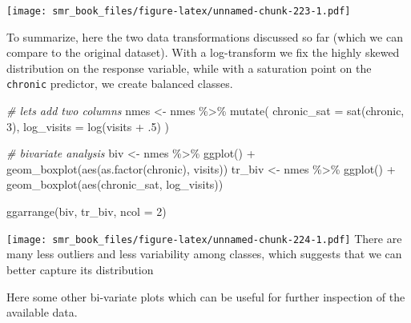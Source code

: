 \documentclass[
  oneside]{book}
\newenvironment{Shaded}{\begin{snugshade}}{\end{snugshade}}
\newcommand{\AttributeTok}[1]{\textcolor[rgb]{0.77,0.63,0.00}{#1}}
\newcommand{\CommentTok}[1]{\textcolor[rgb]{0.56,0.35,0.01}{\textit{#1}}}
\newcommand{\DecValTok}[1]{\textcolor[rgb]{0.00,0.00,0.81}{#1}}
\newcommand{\FunctionTok}[1]{\textcolor[rgb]{0.00,0.00,0.00}{#1}}
\newcommand{\NormalTok}[1]{#1}
\newcommand{\OtherTok}[1]{\textcolor[rgb]{0.56,0.35,0.01}{#1}}
\newcommand{\SpecialCharTok}[1]{\textcolor[rgb]{0.00,0.00,0.00}{#1}}
\begin{document}
\texttt{[image: smr\_book\_files/figure-latex/unnamed-chunk-223-1.pdf]}

To summarize, here the two data transformations discussed so far (which we can compare to the
original dataset). With a log-transform we fix the highly skewed distribution on the response
variable, while with a saturation point on the \texttt{chronic} predictor, we create balanced classes.

\begin{Shaded}
\begin{Highlighting}[]
\CommentTok{\# let\textquotesingle{}s add two columns}
\NormalTok{nmes }\OtherTok{\textless{}{-}}\NormalTok{ nmes }\SpecialCharTok{\%\textgreater{}\%}
  \FunctionTok{mutate}\NormalTok{(}
    \AttributeTok{chronic\_sat =} \FunctionTok{sat}\NormalTok{(chronic, }\DecValTok{3}\NormalTok{),}
    \AttributeTok{log\_visits =} \FunctionTok{log}\NormalTok{(visits }\SpecialCharTok{+}\NormalTok{ .}\DecValTok{5}\NormalTok{)}
\NormalTok{  )}

\CommentTok{\# bivariate analysis}
\NormalTok{biv }\OtherTok{\textless{}{-}}\NormalTok{ nmes }\SpecialCharTok{\%\textgreater{}\%}
  \FunctionTok{ggplot}\NormalTok{() }\SpecialCharTok{+}
  \FunctionTok{geom\_boxplot}\NormalTok{(}\FunctionTok{aes}\NormalTok{(}\FunctionTok{as.factor}\NormalTok{(chronic), visits))}
\NormalTok{tr\_biv }\OtherTok{\textless{}{-}}\NormalTok{ nmes }\SpecialCharTok{\%\textgreater{}\%}
  \FunctionTok{ggplot}\NormalTok{() }\SpecialCharTok{+}
  \FunctionTok{geom\_boxplot}\NormalTok{(}\FunctionTok{aes}\NormalTok{(chronic\_sat, log\_visits))}

\FunctionTok{ggarrange}\NormalTok{(biv, tr\_biv, }\AttributeTok{ncol =} \DecValTok{2}\NormalTok{)}
\end{Highlighting}
\end{Shaded}

\texttt{[image: smr\_book\_files/figure-latex/unnamed-chunk-224-1.pdf]}
There are many less outliers and less variability among classes,
which suggests that we can better capture its distribution

Here some other bi-variate plots which can be useful for further inspection
of the available data.
\end{document}
